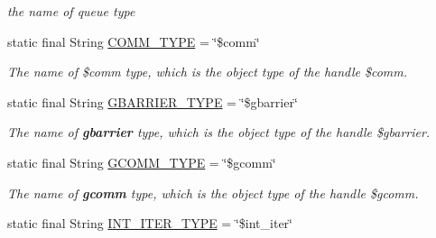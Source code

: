 \begin{DoxyCompactItemize}
\begin{DoxyCompactList}\small\item\em the name of queue type \end{DoxyCompactList}\item 
\hypertarget{classedu_1_1udel_1_1cis_1_1vsl_1_1civl_1_1model_1_1IF_1_1ModelConfiguration_a13210983d25aed1ae4c35a5e3d2d966f}{}static final String \hyperlink{classedu_1_1udel_1_1cis_1_1vsl_1_1civl_1_1model_1_1IF_1_1ModelConfiguration_a13210983d25aed1ae4c35a5e3d2d966f}{C\+O\+M\+M\+\_\+\+T\+Y\+P\+E} = \char`\"{}\$comm\char`\"{}\label{classedu_1_1udel_1_1cis_1_1vsl_1_1civl_1_1model_1_1IF_1_1ModelConfiguration_a13210983d25aed1ae4c35a5e3d2d966f}

\begin{DoxyCompactList}\small\item\em The name of \$comm type, which is the object type of the handle \$comm. \end{DoxyCompactList}\item 
\hypertarget{classedu_1_1udel_1_1cis_1_1vsl_1_1civl_1_1model_1_1IF_1_1ModelConfiguration_abb2d68ebcc0a094b157bdd858d406703}{}static final String \hyperlink{classedu_1_1udel_1_1cis_1_1vsl_1_1civl_1_1model_1_1IF_1_1ModelConfiguration_abb2d68ebcc0a094b157bdd858d406703}{G\+B\+A\+R\+R\+I\+E\+R\+\_\+\+T\+Y\+P\+E} = \char`\"{}\$gbarrier\char`\"{}\label{classedu_1_1udel_1_1cis_1_1vsl_1_1civl_1_1model_1_1IF_1_1ModelConfiguration_abb2d68ebcc0a094b157bdd858d406703}

\begin{DoxyCompactList}\small\item\em The name of {\bfseries gbarrier} type, which is the object type of the handle \$gbarrier. \end{DoxyCompactList}\item 
\hypertarget{classedu_1_1udel_1_1cis_1_1vsl_1_1civl_1_1model_1_1IF_1_1ModelConfiguration_aaf68ad7376d441fbd78a3462120c66f6}{}static final String \hyperlink{classedu_1_1udel_1_1cis_1_1vsl_1_1civl_1_1model_1_1IF_1_1ModelConfiguration_aaf68ad7376d441fbd78a3462120c66f6}{G\+C\+O\+M\+M\+\_\+\+T\+Y\+P\+E} = \char`\"{}\$gcomm\char`\"{}\label{classedu_1_1udel_1_1cis_1_1vsl_1_1civl_1_1model_1_1IF_1_1ModelConfiguration_aaf68ad7376d441fbd78a3462120c66f6}

\begin{DoxyCompactList}\small\item\em The name of {\bfseries gcomm} type, which is the object type of the handle \$gcomm. \end{DoxyCompactList}\item 
\hypertarget{classedu_1_1udel_1_1cis_1_1vsl_1_1civl_1_1model_1_1IF_1_1ModelConfiguration_a6a9e56dbe2ccf59566ebe99e2ad7e8df}{}static final String \hyperlink{classedu_1_1udel_1_1cis_1_1vsl_1_1civl_1_1model_1_1IF_1_1ModelConfiguration_a6a9e56dbe2ccf59566ebe99e2ad7e8df}{I\+N\+T\+\_\+\+I\+T\+E\+R\+\_\+\+T\+Y\+P\+E} = \char`\"{}\$int\+\_\+iter\char`\"{}\label{classedu_1_1udel_1_1cis_1_1vsl_1_1civl_1_1model_1_1IF_1_1ModelConfiguration_a6a9e56dbe2ccf59566ebe99e2ad7e8df}


\end{DoxyCompactItemize}
